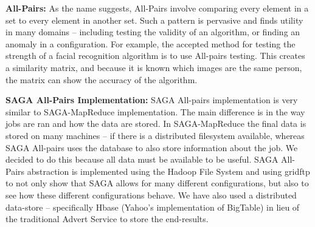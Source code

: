 \documentclass[conference,final]{IEEEtran}
\newcommand{\sagamapreduce }{SAGA-MapReduce }
\begin{document}

{\bf All-Pairs: } As the name suggests, All-Pairs involve comparing
every element in a set to every element in another set.  Such a
pattern is pervasive and finds utility in many domains -- including
testing the validity of an algorithm, or finding an anomaly in a
configuration.  For example, the accepted method for testing the
strength of a facial recognition algorithm is to use All-pairs
testing.  This creates a similarity matrix, and because it is known
which images are the same person, the matrix can show the accuracy of
the algorithm.


{\bf SAGA All-Pairs Implementation: } SAGA All-pairs implementation is
very similar to \sagamapreduce implementation.  The main difference is
in the way jobs are ran and how the data are stored.  In
\sagamapreduce the final data is stored on many machines -- if there
is a distributed filesystem available, whereas SAGA All-pairs uses the
database to also store information about the job.  We decided to do
this because all data must be available to be useful. SAGA All-Pairs
abstraction is implemented using the Hadoop File System and using
gridftp to not only show that SAGA allows for many different
configurations, but also to see how these different configurations
behave. We have also used a distributed data-store -- specifically
Hbase (Yahoo's implementation of BigTable) in lieu of the traditional
Advert Service to store the end-results.

\end{document}
